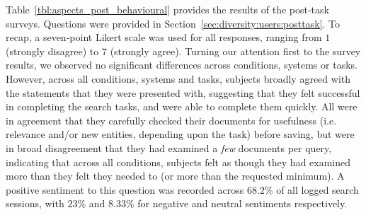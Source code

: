 \begin{table}[t!]
\begin{center}
\begin{tabulary}{\textwidth}{L{0.4cm}@{\CS}L{3.2cm}@{\CS}D{2.5cm}@{\CS}D{2.5cm}@{\CS}D{2.5cm}@{\CS}D{2.5cm}@{\CS}}
    \end{tabulary}
    \end{center}
\end{table}

 Table~\ref{tbl:aspects_post_behavioural} provides the results of the post-task surveys. Questions were provided in Section~\ref{sec:diversity:users:posttask}. To recap, a seven-point Likert scale was used for all responses, ranging from $1$ (strongly disagree) to $7$ (strongly agree). Turning our attention first to the  survey results, we observed no significant differences across conditions, systems or tasks. However, across all conditions, systems and tasks, subjects broadly agreed with the statements that they were presented with, suggesting that they felt successful in completing the search tasks, and were able to complete them quickly. All were in agreement that they carefully checked their documents for usefulness (i.e. relevance and/or new entities, depending upon the task) before saving, but were in broad disagreement that they had examined a \emph{few} documents per query, indicating that across all conditions, subjects felt as though they had examined more than they felt they needed to (or more than the requested minimum). A positive sentiment to this question was recorded across $68.2\%$ of all logged search sessions, with $23\%$ and $8.33\%$ for negative and neutral sentiments respectively.

